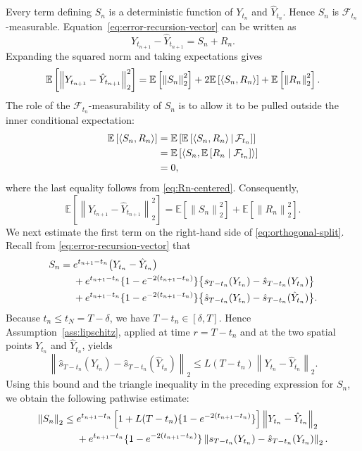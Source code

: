 \documentclass[11pt]{article}
\theoremstyle{definition}
\newcommand{\E}{\mathbb{E}}
\newcommand{\norm}[1]{\left\lVert #1\right\rVert_2}
\newcommand{\ip}[2]{\left\langle #1,#2\right\rangle}
\begin{document}
Every term defining $S_n$ is a deterministic function of
$Y_{t_n}$ and $\hat Y_{t_n}$. Hence $S_n$ is
$\mathcal F_{t_n}$-measurable. Equation~\eqref{eq:error-recursion-vector}
can be written as
\[
    Y_{t_{n+1}}-\hat Y_{t_{n+1}}=S_n+R_n.
\]
Expanding the squared norm and taking expectations gives
\begin{align}
\E\left[
    \norm{Y_{t_{n+1}}-\hat Y_{t_{n+1}}}^2
\right]
=
\E\left[\norm{S_n}^2\right]
+2\E\left[\ip{S_n}{R_n}\right]
+\E\left[\norm{R_n}^2\right].\notag
\end{align}
The role of the $\mathcal F_{t_n}$-measurability of $S_n$ is to
allow it to be pulled outside the inner conditional expectation:
\begin{align}
\E\left[\ip{S_n}{R_n}\right]
&=
\E\left[
    \E\left[
        \ip{S_n}{R_n}
        \,\middle|\,
        \mathcal F_{t_n}
    \right]
\right]\notag\\
&=
\E\left[
    \ip{
        S_n
    }{
        \E\left[R_n\mid\mathcal F_{t_n}\right]
    }
\right]\notag\\
&=0,\notag
\end{align}
where the last equality follows from \eqref{eq:Rn-centered}.
Consequently,
\begin{equation}
    \E\left[\norm{Y_{t_{n+1}}-\hat Y_{t_{n+1}}}^2\right]
    =\E\left[\norm{S_n}^2\right]+\E\left[\norm{R_n}^2\right].
    \label{eq:orthogonal-split}
\end{equation}
We next estimate the first term on the right-hand side of
\eqref{eq:orthogonal-split}. Recall from
\eqref{eq:error-recursion-vector} that
\begin{align}
S_n={}&e^{t_{n+1}-t_n}\bigl(Y_{t_n}-\hat Y_{t_n}\bigr)\notag\\
&+e^{t_{n+1}-t_n}\{1-e^{-2(t_{n+1}-t_n)}\}
  \bigl\{s_{T-t_n}(Y_{t_n})
  -\hat s_{T-t_n}(Y_{t_n})\bigr\}\notag\\
&+e^{t_{n+1}-t_n}\{1-e^{-2(t_{n+1}-t_n)}\}
  \bigl\{\hat s_{T-t_n}(Y_{t_n})
  -\hat s_{T-t_n}(\hat Y_{t_n})\bigr\}.\notag
\end{align}
Because $t_n\le t_N=T-\delta$, we have
$T-t_n\in[\delta,T]$. Hence Assumption~\ref{ass:lipschitz},
applied at time $r=T-t_n$ and at the two spatial points
$Y_{t_n}$ and $\hat Y_{t_n}$, yields
\[
\norm{
    \hat s_{T-t_n}(Y_{t_n})
    -\hat s_{T-t_n}(\hat Y_{t_n})
}
\le
L(T-t_n)\norm{Y_{t_n}-\hat Y_{t_n}}.
\]
Using this bound and the triangle inequality in the preceding
expression for $S_n$, we obtain the following pathwise estimate:
\begin{align}
\norm{S_n}
\le{}&
e^{t_{n+1}-t_n}
\left[1+L(T-t_n)\{1-e^{-2(t_{n+1}-t_n)}\}\right]
\norm{Y_{t_n}-\hat Y_{t_n}}\notag\\
&+e^{t_{n+1}-t_n}\{1-e^{-2(t_{n+1}-t_n)}\}
\norm{
    s_{T-t_n}(Y_{t_n})
    -\hat s_{T-t_n}(Y_{t_n})
}.\notag
\end{align}
\end{document}
